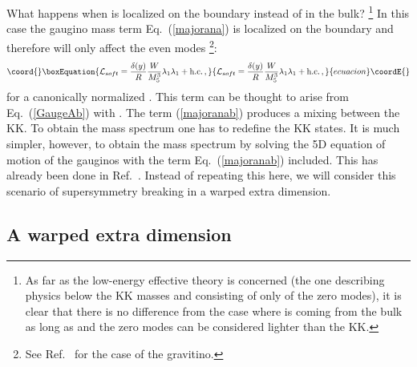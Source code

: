 \documentclass[a4paper,12pt]{article}
\begin{document}
What happens
when  \coordHE{} is localized on the boundary instead of in the bulk?
\footnote{As far as the low-energy effective theory is concerned
(the one describing  physics below the KK masses and 
consisting of  only of the zero modes), it is clear
that there is no difference 
from  the case where \coordHE{} is coming from the bulk as long as
\coordHE{} and the zero modes can be considered
 lighter than the KK.}
In this case
the gaugino mass term Eq.~(\ref{majorana}) is
localized on the boundary
and therefore will only affect the even modes
\footnote{See Ref.~\cite{fabio} for the case of the gravitino.}:
\begin{equation}\coord{}\boxEquation{
{\cal L}_{soft}=\frac{\delta(y)}{R}\frac{W}{M^3_5}\lambda_1\lambda_1+
\text{h.c.}\, ,
\label{majoranab}
}{
{\cal L}_{soft}=\frac{\delta(y)}{R}\frac{W}{M^3_5}\lambda_1\lambda_1+
\text{h.c.}\, ,
}{ecuacion}\coordE{}\end{equation}
for a   canonically normalized \coordHE{}. 
This term can be thought to arise  from Eq.~(\ref{GaugeAb})    with 
\coordHE{}. 
The term (\ref{majoranab})
produces a mixing between the KK. To obtain 
the mass spectrum one has to redefine the KK states. 
It is much simpler, however,
to obtain the mass spectrum
by
 solving the 5D equation of motion of the gauginos with the term
Eq.~(\ref{majoranab}) included.
This  has already been done in Ref.~\cite{ahnsw}.
Instead of repeating this here, we will consider this
 scenario of supersymmetry breaking
in a  warped extra dimension.




\subsection{A warped extra dimension}
\end{document}
